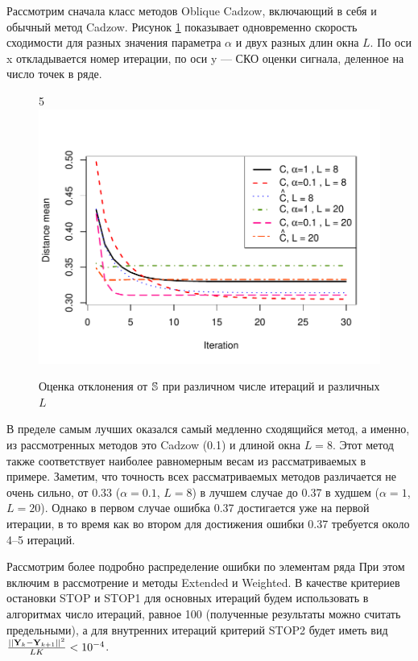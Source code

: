 \documentclass[12pt,a4paper,fleqn,leqno]{article}
\begin{document}
Рассмотрим сначала класс методов Oblique Cadzow, включающий в себя и обычный метод Cadzow.
Рисунок \ref{img_cadzowspeed2} показывает одновременно скорость сходимости для разных значения параметра $\alpha$ и двух разных длин окна $L$.
По оси x откладывается номер итерации, по оси y --- СКО оценки сигнала, деленное на число точек в ряде.
\begin{figure}[!hhh]
\begin{center}
5\includegraphics[width = 15cm]{cadzowspeed_2.pdf}
\caption{Оценка отклонения от $\mathbb{S}$ при различном числе итераций и различных $L$}
\label{img_cadzowspeed2}
\end{center}
\end{figure}

В пределе самым лучших оказался самый медленно сходящийся метод, а именно, из рассмотренных методов это Cadzow (0.1) и длиной окна $L=8$.
Этот метод также соответствует наиболее равномерным весам из рассматриваемых в примере.
Заметим, что точность всех рассматриваемых методов различается не очень сильно, от 0.33 ($\alpha=0.1$, $L=8$) в лучшем случае до 0.37 в худшем
($\alpha=1$, $L=20$). Однако в первом случае ошибка 0.37 достигается уже на первой итерации, в то время как во втором для
достижения ошибки 0.37 требуется около 4--5 итераций.

Рассмотрим более подробно распределение ошибки по элементам ряда При этом включим в рассмотрение и
методы Extended и Weighted.
В качестве критериев остановки STOP и STOP1 для основных итераций будем использовать в алгоритмах число итераций, равное 100 (полученные результаты
можно считать предельными), а для внутренних итераций критерий STOP2 будет иметь вид $\frac{||\mathbf{Y}_k - \mathbf{Y}_{k+1}||^2}{LK} < 10^{-4}$. 
\end{document}
